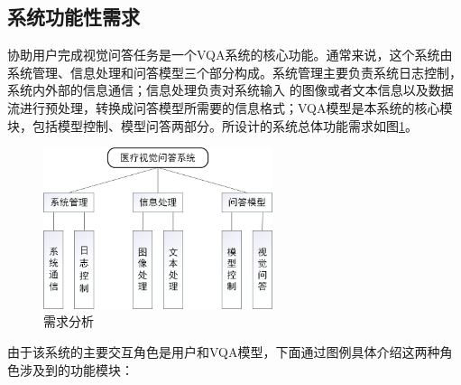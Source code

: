 \subsection{系统功能性需求}
协助用户完成视觉问答任务是一个VQA系统的核心功能。通常来说，这个系统由系统管理、信息处理和问答模型三个部分构成。系统管理主要负责系统日志控制，系统内外部的信息通信；信息处理负责对系统输入
的图像或者文本信息以及数据流进行预处理，转换成问答模型所需要的信息格式；VQA模型是本系统的核心模块，包括模型控制、模型问答两部分。所设计的系统总体功能需求如图\ref{sys_need}。
\begin{figure}[htbp]
	\centering	
	\includegraphics[width=0.6\textwidth]{Fig/myfig/chapter5/sys_need.png}  %
	\caption{\label{sys_need}需求分析} 
\end{figure}
由于该系统的主要交互角色是用户和VQA模型，下面通过图例具体介绍这两种角色涉及到的功能模块：
